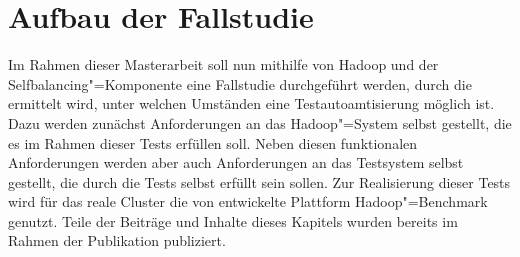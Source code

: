 \chapter{Aufbau der Fallstudie}
\label{sec:fallstudie}

Im Rahmen dieser Masterarbeit soll nun mithilfe von Hadoop und der Selfbalancing"=Komponente eine Fallstudie durchgeführt werden, durch die ermittelt wird, unter welchen Umständen eine Testautoamtisierung möglich ist.
Dazu werden zunächst Anforderungen an das Hadoop"=System selbst gestellt, die es im Rahmen dieser Tests erfüllen soll.
Neben diesen funktionalen Anforderungen werden aber auch Anforderungen an das Testsystem selbst gestellt, die durch die Tests selbst erfüllt sein sollen.
Zur Realisierung dieser Tests wird für das reale Cluster die von \citeauthor{zhang2016} entwickelte Plattform Hadoop"=Benchmark genutzt.
Teile der Beiträge und Inhalte dieses Kapitels wurden bereits im Rahmen der Publikation \cite{Eberhardinger2018} publiziert.






